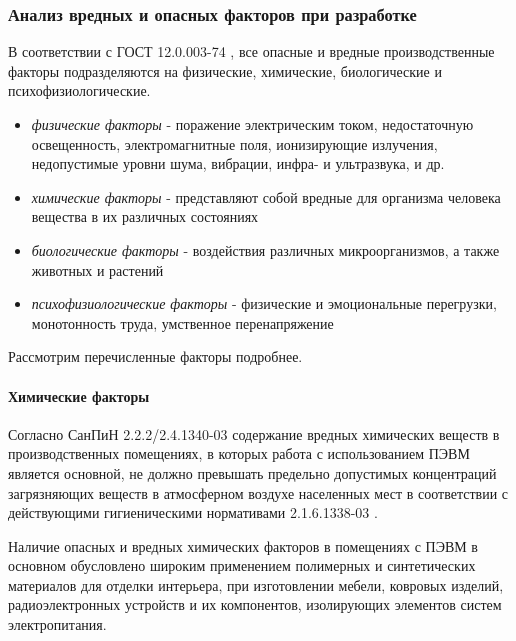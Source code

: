 \newpage
\subsubsection{Анализ вредных и опасных факторов при разработке}

В соответствии с ГОСТ 12.0.003-74 \cite{ecology_gost_003_74}, все опасные и
вредные производственные факторы подразделяются на физические, химические,
биологические и психофизиологические.

\begin{itemize}
    \item   \textit{физические факторы} - поражение электрическим током, недостаточную
            освещенность, электромагнитные поля, ионизирующие излучения, недопустимые
            уровни шума, вибрации, инфра- и ультразвука, и др.
    \item   \textit{химические факторы} - представляют собой вредные для организма
            человека вещества в их различных состояниях
    \item   \textit{биологические факторы} - воздействия различных микроорганизмов,
            а также животных и растений
    \item   \textit{психофизиологические факторы} - физические и эмоциональные
            перегрузки, монотонность труда, умственное перенапряжение

\end{itemize}

Рассмотрим перечисленные факторы подробнее.

\paragraph{Химические факторы}

Согласно СанПиН 2.2.2/2.4.1340-03 \cite{ecology_sanpin_1340_03} содержание вредных
химических веществ в производственных помещениях, в которых работа с использованием
ПЭВМ является основной, не должно превышать предельно допустимых концентраций
загрязняющих веществ в атмосферном воздухе населенных мест в соответствии с
действующими гигиеническими нормативами 2.1.6.1338-03
\cite{ecology_hygiene_norm_1338_03}.

Наличие опасных и вредных химических факторов в помещениях с ПЭВМ в основном
обусловлено широким применением полимерных и синтетических материалов для отделки
интерьера, при изготовлении мебели, ковровых изделий, радиоэлектронных устройств
и их компонентов, изолирующих элементов систем электропитания.

